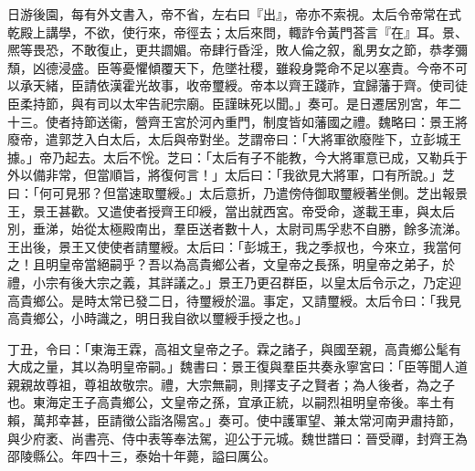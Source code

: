 \begin{pinyinscope}
日游後園，每有外文書入，帝不省，左右曰『出』，帝亦不索視。太后令帝常在式乾殿上講學，不欲，使行來，帝徑去；太后來問，輙詐令黃門荅言『在』耳。景、熈等畏恐，不敢復止，更共讇媚。帝肆行昏淫，敗人倫之叙，亂男女之節，恭孝彌頹，凶德浸盛。臣等憂懼傾覆天下，危墜社稷，雖殺身斃命不足以塞責。今帝不可以承天緒，臣請依漢霍光故事，收帝璽綬。帝本以齊王踐祚，宜歸藩于齊。使司徒臣柔持節，與有司以太牢告祀宗廟。臣謹昧死以聞。」奏可。是日遷居別宮，年二十三。使者持節送衞，營齊王宮於河內重門，制度皆如藩國之禮。魏略曰：景王將廢帝，遣郭芝入白太后，太后與帝對坐。芝謂帝曰：「大將軍欲廢陛下，立彭城王據。」帝乃起去。太后不恱。芝曰：「太后有子不能教，今大將軍意已成，又勒兵于外以備非常，但當順旨，將復何言！」太后曰：「我欲見大將軍，口有所說。」芝曰：「何可見邪？但當速取璽綬。」太后意折，乃遣傍侍御取璽綬著坐側。芝出報景王，景王甚歡。又遣使者授齊王印綬，當出就西宮。帝受命，遂載王車，與太后別，垂涕，始從太極殿南出，羣臣送者數十人，太尉司馬孚悲不自勝，餘多流涕。王出後，景王又使使者請璽綬。太后曰：「彭城王，我之季叔也，今來立，我當何之！且明皇帝當絕嗣乎？吾以為高貴鄉公者，文皇帝之長孫，明皇帝之弟子，於禮，小宗有後大宗之義，其詳議之。」景王乃更召群臣，以皇太后令示之，乃定迎高貴鄉公。是時太常已發二日，待璽綬於溫。事定，又請璽綬。太后令曰：「我見高貴鄉公，小時識之，明日我自欲以璽綬手授之也。」

丁丑，令曰：「東海王霖，高祖文皇帝之子。霖之諸子，與國至親，高貴鄉公髦有大成之量，其以為明皇帝嗣。」魏書曰：景王復與羣臣共奏永寧宮曰：「臣等聞人道親親故尊祖，尊祖故敬宗。禮，大宗無嗣，則擇支子之賢者；為人後者，為之子也。東海定王子高貴鄉公，文皇帝之孫，宜承正統，以嗣烈祖明皇帝後。率土有賴，萬邦幸甚，臣請徵公詣洛陽宮。」奏可。使中護軍望、兼太常河南尹肅持節，與少府袤、尚書亮、侍中表等奉法駕，迎公于元城。魏世譜曰：晉受禪，封齊王為邵陵縣公。年四十三，泰始十年薨，謚曰厲公。


\end{pinyinscope}